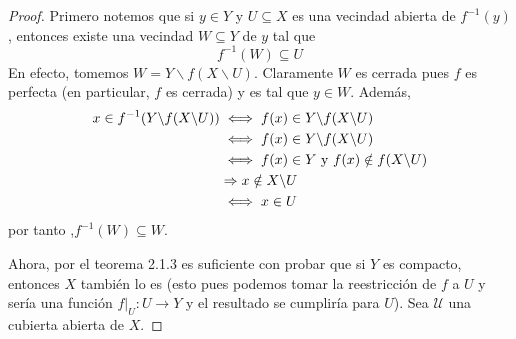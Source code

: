 \documentclass[12pt]{report}
\theoremstyle{largebreak}
\newcommand\cf[3]{\ensuremath{#1:#2\rightarrow#3}}
\begin{document}
    \begin{proof}
        Primero notemos que si $y\in Y$ y $U\subseteq X$ es una vecindad abierta de $f^{-1}(y)$, entonces existe una vecindad $W\subseteq Y$ de $y$ tal que
        \begin{equation*}
            f^{-1}(W)\subseteq U
        \end{equation*}
        En efecto, tomemos $W=Y\backslash f(X\backslash U)$. Claramente $W$ es cerrada pues $f$ es perfecta (en particular, $f$ es cerrada) y es tal que $y\in W$. Además,
        \begin{equation*}
            \begin{split}
                x\in f^{-1}(Y\backslash f(X\backslash U))&\iff f(x)\in Y\backslash f(X\backslash U)\\
                &\iff f(x)\in Y\backslash f(X\backslash U)\\
                &\iff f(x)\in Y\textup{ y }f(x)\notin f(X\backslash U)\\
                &\Rightarrow x\notin X\backslash U\\
                &\iff x\in U\\
            \end{split}
        \end{equation*}
        por tanto ,$f^{-1}(W)\subseteq W$.

        Ahora, por el teorema 2.1.3 es suficiente con probar que si $Y$ es compacto, entonces $X$ también lo es (esto pues podemos tomar la reestricción de $f$ a $U$ y sería una función $\cf{f\big|_U}{U}{Y}$ y el resultado se cumpliría para $U$). Sea $\mathcal{U}$ una cubierta abierta de $X$.
        

\end{proof}
\end{document}
